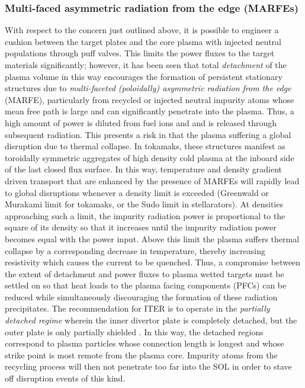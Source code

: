 \documentclass[11pt,titlepage]{report}
\begin{document}
\subsubsection{Multi-faced asymmetric radiation from the edge (MARFEs)}

 \indent \indent  With respect to the concern just outlined above, it is possible to engineer a cushion between the target plates and the core plasma with injected neutral populations through puff valves. This limits the power fluxes to the target materials significantly; however, it has been seen that total \emph{detachment} of the plasma volume in this way encourages the formation of persistent stationary structures due to \emph{multi-faceted (poloidally) asymmetric radiation from the edge} (MARFE), particularly from recycled or injected neutral impurity atoms whose mean free path is large and can significantly penetrate into the plasma. Thus, a high amount of power is diluted from fuel ions and and is released through subsequent radiation. This presents a risk in that the plasma suffering a global disruption due to thermal collapse. In tokamaks, these structures manifest as toroidally symmetric aggregates of high density cold plasma at the inboard side of the last closed flux surface. In this way, temperature and density gradient driven transport that are enhanced by the presence of MARFEs will rapidly lead to global disruptions whenever a density limit is exceeded (Greenwald or Murakami limit for tokamaks, or the Sudo limit in stellarators). At densities approaching such a limit, the impurity radiation power is proportional to the square of its density so that it increases until the impurity radiation power becomes equal with the power input. Above this limit the plasma suffers thermal collapse by a corresponding decrease in temperature, thereby increasing resistivity which causes the current to be quenched. Thus, a compromise between the extent of detachment and power fluxes to plasma wetted targets must be settled on so that heat loads to the plasma facing components (PFCs) can be reduced while simultaneously discouraging the formation of these radiation precipitates. The recommendation for ITER is to operate in the \emph{partially detached regime} wherein the inner divertor plate is completely detached, but the outer plate is only partially shielded \cite{EFDA_MARFE}. In this way, the detached regions correspond to plasma particles whose connection length is longest and whose strike point is most remote from the plasma core. Impurity atoms from the recycling process will then not penetrate too far into the SOL in order to stave off disruption events of this kind.
\end{document}
